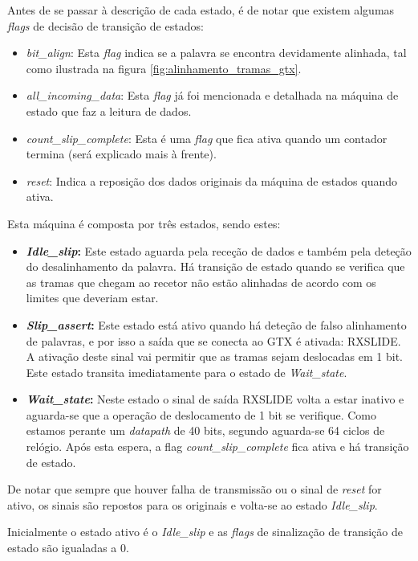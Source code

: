 \documentclass[11pt,a4paper]{article}
\begin{document}
\begin{enumerate}
		Antes de se passar à descrição de cada estado, é de notar que existem algumas \textit{flags} de decisão de transição de estados:
		\begin{itemize}
			\item \textit{bit\_align}: Esta \textit{flag} indica se a palavra se encontra devidamente alinhada, tal como ilustrada na figura \ref{fig:alinhamento_tramas_gtx}. 
			
			\item \textit{all\_incoming\_data}: Esta \textit{flag} já foi mencionada e detalhada na máquina de estado que faz a leitura de dados.
			
			\item \textit{count\_slip\_complete}: Esta é uma \textit{flag} que fica ativa quando um contador termina (será explicado mais à frente).
			
			\item \textit{reset}: Indica a reposição dos dados originais da máquina de estados quando ativa.
		\end{itemize}
		
		
		Esta máquina é composta por três estados, sendo estes:
		\begin{itemize}
			\item \textbf{\textit{Idle\_slip}:} Este estado aguarda pela receção de dados e também pela deteção do desalinhamento da palavra. Há transição de estado quando se verifica que as tramas que chegam ao recetor não estão alinhadas de acordo com os limites que deveriam estar.
			
			\item \textbf{\textit{Slip\_assert}:} Este estado está ativo quando há deteção de falso alinhamento de palavras, e por isso a saída que se conecta ao GTX é ativada: RXSLIDE. A ativação deste sinal vai permitir que as tramas sejam deslocadas em 1 bit. Este estado transita imediatamente para o estado de \textit{Wait\_state}.
			
			\item \textbf{\textit{Wait\_state}:} Neste estado o sinal de saída RXSLIDE volta a estar inativo e aguarda-se que a operação de deslocamento de 1 bit se verifique. Como estamos perante um \textit{datapath} de 40 bits, segundo \cite{R011} aguarda-se 64 ciclos de relógio. Após esta espera, a flag \textit{count\_slip\_complete} fica ativa e há transição de estado.
		\end{itemize}
		
		De notar que sempre que houver falha de transmissão ou o sinal de \textit{reset} for ativo, os sinais são repostos para os originais e volta-se ao estado \textit{Idle\_slip}.
		
		
		Inicialmente o estado ativo é o {\textit{Idle\_slip} }e as \textit{flags} de sinalização de transição de estado são igualadas a 0.
		
	\end{enumerate}
	
\end{document}
